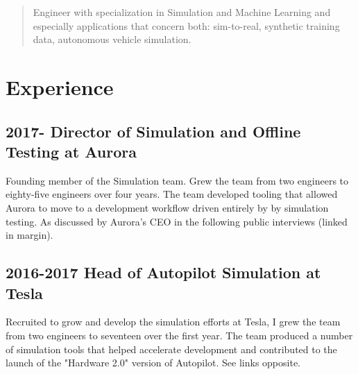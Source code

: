 \maketitle
{}


\begin{abstract}
Engineer with specialization in Simulation and Machine Learning and especially applications that concern both: sim-to-real, synthetic training data, autonomous vehicle simulation.
\end{abstract}

\section{Experience}

\subsection{2017- Director of Simulation and Offline Testing at Aurora}


Founding member of the Simulation team. Grew the team from two engineers to eighty-five engineers over four years. The team developed tooling that allowed Aurora to move to a development workflow driven entirely by by simulation testing. As discussed by Aurora's CEO in the following public interviews (linked in margin).

\subsection{2016-2017 Head of Autopilot Simulation at Tesla}

\marginnote{\href{}{}}
\marginnote{\href{}{}}
Recruited to grow and develop the simulation efforts at Tesla, I grew the team from two engineers to seventeen over the first year. The team produced a number of simulation tools that helped accelerate development and contributed to the launch of the "Hardware 2.0" version of Autopilot. See links opposite.

